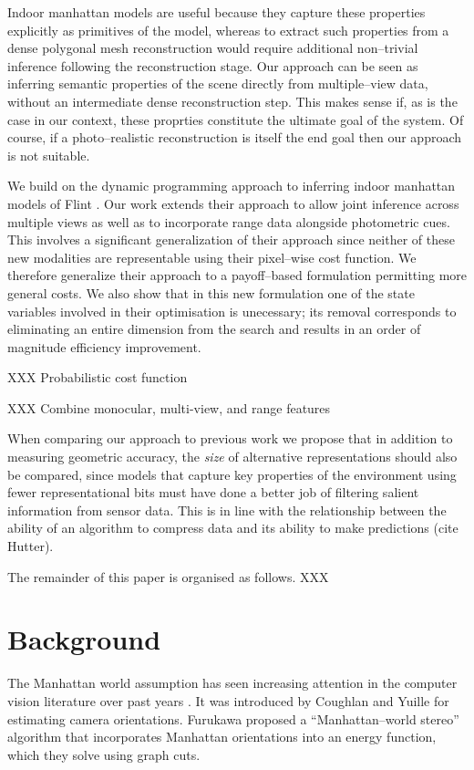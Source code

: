 \documentclass{article}
\begin{document}
Indoor manhattan models are useful because they capture these
properties explicitly as primitives of the model, whereas to extract
such properties from a dense polygonal mesh reconstruction would
require additional non--trivial inference following the reconstruction
stage. Our approach can be seen as inferring semantic properties of
the scene directly from multiple--view data, without an intermediate
dense reconstruction step. This makes sense if, as is the case in our
context, these proprties constitute the ultimate goal of the
system. Of course, if a photo--realistic reconstruction is itself the
end goal then our approach is not suitable.

We build on the dynamic programming approach to inferring indoor
manhattan models of Flint \etal \cite{FlintECCV10}. Our work extends
their approach to allow joint inference across multiple views as well
as to incorporate range data alongside photometric cues. This involves
a significant generalization of their approach since neither of these
new modalities are representable using their pixel--wise cost
function. We therefore generalize their approach to a payoff--based
formulation permitting more general costs. We also show that in this
new formulation one of the state variables involved in their
optimisation is unecessary; its removal corresponds to eliminating an
entire dimension from the search and results in an order of magnitude
efficiency improvement.

XXX Probabilistic cost function

XXX Combine monocular, multi-view, and range features

When comparing our approach to previous work we propose that in
addition to measuring geometric accuracy, the \textit{size} of
alternative representations should also be compared, since models that
capture key properties of the environment using fewer representational
bits must have done a better job of filtering salient information
from sensor data. This is in line with the relationship between the
ability of an algorithm to compress data and its ability to make
predictions (cite Hutter).

The remainder of this paper is organised as follows. XXX

\section{Background}

The Manhattan world assumption has seen increasing attention in the
computer vision literature over past years
\cite{Coughlan99,Zhang02,Lee09,Furukawa09,FlintECCV10}. It was
introduced by Coughlan and Yuille\cite{Coughlan99} for estimating
camera orientations. Furukawa \etal \cite{Furukawa09} proposed a
``Manhattan--world stereo'' algorithm that incorporates Manhattan
orientations into an energy function, which they solve using graph
cuts. 
\end{document}
